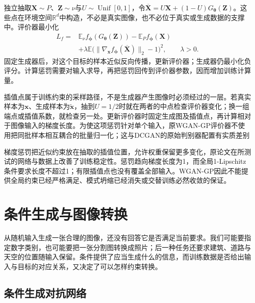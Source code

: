 独立抽取$\bm{X}\sim P$、$\bm{Z}\sim\nu$与$U\sim\operatorname{Unif}[0,1]$，令$\overline{\bm{X}}=U\bm{X}+(1-U)G_{\bm{\theta}}(\bm{Z})$。这些点在环境空间$\mathbb{R}^{d}$中构造，不必是真实图像，也不必位于真实或生成数据的支撑中。评价器最小化
\begin{equation}
  \label{eq:neural-generative-wgan-gp}
  \begin{aligned}
  L_f={}&\mathbb{E}_{\nu}f_{\bm{\phi}}(G_{\bm{\theta}}(\bm{Z}))
        -\mathbb{E}_{P}f_{\bm{\phi}}(\bm{X})\\
        &+\lambda\mathbb{E}
        \bigl(\lVert\nabla_{\bm{x}}
                    f_{\bm{\phi}}(\overline{\bm{X}})\rVert_2-1\bigr)^2,
        \qquad\lambda>0.
  \end{aligned}
\end{equation}
固定生成器后，对这个目标的样本近似反向传播，更新评价器；生成器仍最小化负评分。计算惩罚需要对输入求导，再把惩罚回传到评价器参数，因而增加训练计算量。

插值点属于训练约束的采样路径，不是生成器产生图像时必须经过的一层。若真实样本为$\bm{x}$、生成样本为$\widetilde{\bm{x}}$，抽到$U=1/2$时就在两者的中点检查评价器变化；换一组端点或插值系数，就检查另一处。更新评价器时固定生成图及插值点，再计算相对于图像输入的梯度长度。为使这项惩罚针对单个输入，原WGAN-GP评价器不使用把同批样本相互耦合的批量归一化；这与DCGAN的原始判别器配置有实质差别

梯度惩罚把近似约束放在抽取的插值位置，允许权重保留更多变化，原论文在所测试的网络与数据上改善了训练稳定性。惩罚趋向梯度长度为1，而全局1-Lipschitz条件要求长度不超过1；有限插值点也没有覆盖全部输入。WGAN-GP因此不能提供全局约束已经严格满足、模式坍缩已经消失或交替训练必然收敛的保证。

\section{条件生成与图像转换}
\label{sec:neural-generative-conditional}

从随机输入生成一张合理的图像，还没有回答它是否满足当前要求。我们可能要指定数字类别，也可能要把一张分割图转换成照片；后一种任务还要求建筑、道路与天空的位置随输入保留。条件提供了应当生成什么的信息，而训练数据是否给出输入与目标的对应关系，又决定了可以怎样约束转换。

\subsection{条件生成对抗网络}
\label{sec:neural-generative-cgan}

